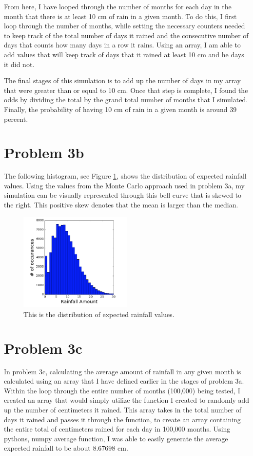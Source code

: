 \documentclass[twocolumn]{revtex4}
\begin{document}
	From here, I have looped through the number of months for each day in the month that there is at least 10 cm of rain in a given month. To do this, I first loop through the number of months, while setting the necessary counters needed to keep track of the total number of days it rained and the consecutive number of days that counts how many days in a row it rains. Using an array, I am able to add values that will keep track of days that it rained at least 10 cm and he days it did not.
	
	The final stages of this simulation is to add up the number of days in my array that were greater than or equal to 10 cm. Once that step is complete, I found the odds by dividing the total by the grand total number of months that I simulated. Finally, the probability of having 10 cm of rain in a given month is around 39 percent. 

\section{Problem 3b}
	The following histogram, see Figure \ref{Expected}, shows the distribution of expected rainfall values. Using the values from the Monte Carlo approach used in problem 3a, my simulation can be visually represented through this bell curve that is skewed to the right. This positive skew denotes that the mean is larger than the median.
	\begin{figure}[h]

		\centering
		\includegraphics[width=0.5\textwidth]{rainfall.png}
		\caption{This is the distribution of expected rainfall values. \label{Expected}}

	\end{figure}

\section{Problem 3c}
	In problem 3c, calculating the average amount of rainfall in any given month is calculated using an array that I have defined earlier in the stages of problem 3a. Within the loop through the entire number of months (100,000) being tested, I created an array that would simply utilize the function I created to randomly add up the number of centimeters it rained. This array takes in the total number of days it rained and passes it through the function, to create an array containing the entire total of centimeters rained for each day in 100,000 months. Using pythons, numpy average function, I was able to easily generate the average expected rainfall to be about 8.67698 cm. 
	
\end{document}
